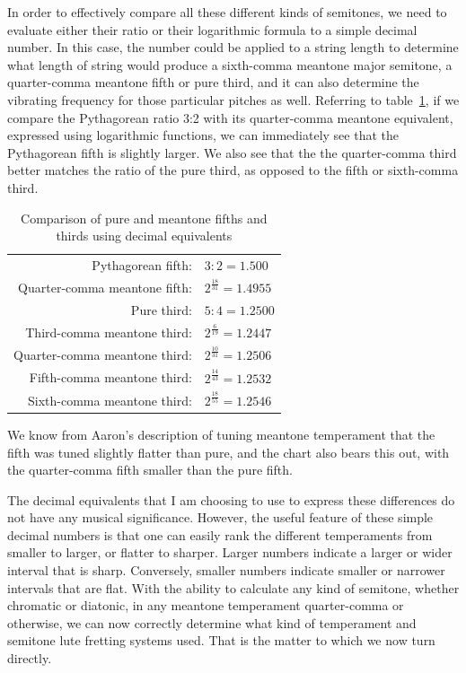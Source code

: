 In order to effectively compare all these different kinds of semitones, we need to
evaluate either their ratio or their logarithmic formula to a simple decimal number. In
this case, the number could be applied to a string length to determine what length of
string would produce a sixth-comma meantone major semitone, a quarter-comma meantone
fifth or pure third, and it can also determine the vibrating frequency for those
particular pitches as well. Referring to table~\ref{fifth-comparison}, if we compare
the Pythagorean ratio 3:2 with its quarter-comma meantone equivalent, expressed using
logarithmic functions, we can immediately see that the Pythagorean fifth is slightly
larger.  We also see that the the quarter-comma third better matches the ratio of the
pure third, as opposed to the fifth or sixth-comma third.
\begin{table}[h!]
    \begin{center}
    \begin{tabular}{ r l }
        Pythagorean fifth:            & $ 3:2 = 1.500 $ \\
        Quarter-comma meantone fifth: & $ 2^\frac{18}{31} = 1.4955 $ \\
        \hline
        Pure third:                   & $ 5:4 = 1.2500 $ \\
        Third-comma meantone third:   & $ 2^\frac{6}{19} = 1.2447 $ \\
        Quarter-comma meantone third: & $ 2^\frac{10}{31} = 1.2506 $ \\
        Fifth-comma meantone third:   & $ 2^\frac{14}{43} = 1.2532 $ \\
        Sixth-comma meantone third:   & $ 2^\frac{18}{55} = 1.2546 $ \\
    \end{tabular}
    \end{center}
    \caption{Comparison of pure and meantone fifths and thirds using decimal equivalents}
    \label{fifth-comparison}
\end{table}
We know from Aaron's description of tuning meantone temperament that the fifth was
tuned slightly flatter than pure, and the chart also bears this out, with the
quarter-comma fifth smaller than the pure fifth.

The decimal equivalents that I am choosing to use to express these differences do not
have any musical significance. However, the useful feature of these simple decimal
numbers is that one can easily rank the different temperaments from smaller to larger,
or flatter to sharper. Larger numbers indicate a larger or wider interval that is
sharp.  Conversely, smaller numbers indicate smaller or narrower intervals that are
flat.  With the ability to calculate any kind of semitone, whether chromatic or
diatonic, in any meantone temperament quarter-comma or otherwise, we can now correctly
determine what kind of temperament and semitone lute fretting systems used.  That is
the matter to which we now turn directly.